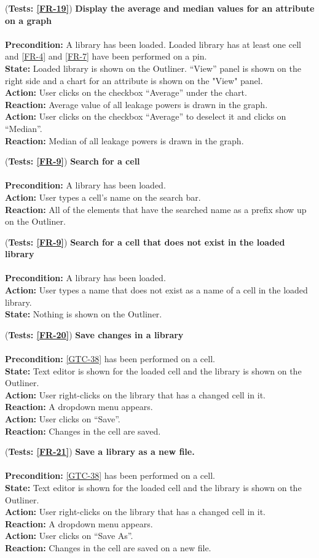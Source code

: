 \documentclass[10pt,a4paper]{report}
\newcommand{\precondition}[1]{
    \textbf{Precondition: } #1 \leavevmode \\
}
\newcommand{\action}[1]{
    \textbf{Action: } #1 \leavevmode \\
}
\newcommand{\state}[1]{
    \textbf{State: } #1 \leavevmode \\
}
\newcommand{\reaction}[1]{
    \textbf{Reaction: } #1 \leavevmode \\
}
\newcommand{\GTCDescription}[2]{
    (\textbf{Tests: #1}) \textbf{#2} \leavevmode \\
}
\begin{document}
\begin{GTC}
     \item \GTCDescription{\ref{FR-19}}
     {Display the average and median values for an attribute on a graph } \leavevmode \\ 
        \precondition{A library has been loaded. Loaded library has at least one cell and \ref{FR-4} and \ref{FR-7} have been performed on a pin.}
        \state{Loaded library is shown on the Outliner. “View” panel is shown on the right side and a chart for an attribute is shown on the "View" panel.}
        \action{User clicks on the checkbox “Average” under the chart.}
         \reaction{Average value of all leakage powers is drawn in the graph.}
        \action{User clicks on the checkbox “Average” to deselect it and clicks on “Median”.}
        \reaction{Median of all leakage powers is drawn in the graph.}\label{GTC-45}
     
    \item \GTCDescription{\ref{FR-9}}
    {Search for a cell} \leavevmode \\ 
        \precondition{A library has been loaded.}
        \action{User types a cell’s name on the search bar.}
        \reaction{All of the elements that have the searched name as a prefix show up on the Outliner.}\label{GTC-46}
    
    \item \GTCDescription{\ref{FR-9}}
    {Search for a cell that does not exist in the loaded library} \leavevmode \\ 
        \precondition{A library has been loaded.}
        \action{User types a name that does not exist as a name of a cell in the loaded library.}
        \state{Nothing is shown on the Outliner.}\label{GTC-47}
    
    \item \GTCDescription{\ref{FR-20}}
    {Save changes in a library} \leavevmode \\ 
        \precondition{\ref{GTC-38} has been performed on a cell.}
        \state{Text editor is shown for the loaded cell and the library is shown on the Outliner.}
        \action{User right-clicks on the library that has a changed cell in it.}
        \reaction{A dropdown menu appears.}
        \action{User clicks on “Save”.} 
        \reaction{Changes in the cell are saved.}\label{GTC-48}
    
    \item \GTCDescription{\ref{FR-21}}
    {Save a library as a new file.} \leavevmode \\ 
        \precondition{\ref{GTC-38} has been performed on a cell.}
        \state{Text editor is shown for the loaded cell and the library is shown on the Outliner.}
        \action{User right-clicks on the library that has a changed cell in it.}
        \reaction{A dropdown menu appears.}
        \action{User clicks on “Save As”.}
        \reaction{Changes in the cell are saved on a new file.}\label{GTC-49}
    
    

    
\end{GTC}
\end{document}
